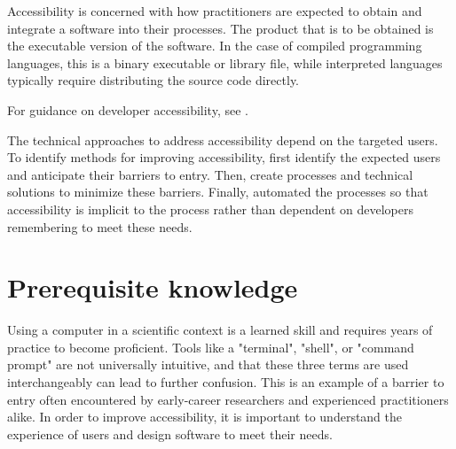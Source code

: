 \documentclass[]{nrel}
\begin{document}
Accessibility is concerned with how practitioners are expected to obtain and integrate a software
into their processes. The product that is to be obtained is the executable version of the software.
In the case of compiled programming languages, this is a binary executable or library file,
while interpreted languages typically require distributing the source code directly.

For guidance on developer accessibility, see .

The technical approaches to address accessibility depend on the targeted users.
To identify methods for improving accessibility, first identify the expected users and
anticipate their barriers to entry.
Then, create processes and technical solutions to minimize these barriers.
Finally, automated the processes so that accessibility is implicit to the process rather than
dependent on developers remembering to meet these needs.

\section{Prerequisite knowledge}

Using a computer in a scientific context is a learned skill and requires years of practice to
become proficient. Tools like a "terminal", "shell", or "command prompt" are not universally
intuitive, and that these three terms are used interchangeably can lead to further confusion.
This is an example of a barrier to entry often encountered by early-career researchers and
experienced practitioners alike. In order to improve accessibility, it is important to
understand the experience of users and design software to meet their needs.
\end{document}
